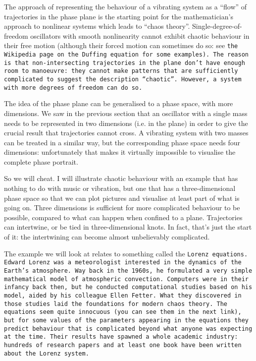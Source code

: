 

  The approach of representing the behaviour of a vibrating system as a 
  ``flow'' of trajectories in the phase plane is the starting point for the 
  mathematician’s approach to nonlinear systems which leads to ``chaos 
  theory''. Single-degree-of-freedom oscillators with smooth nonlinearity 
  cannot exhibit chaotic behaviour in their free motion (although their forced 
  motion can sometimes do so: see \tt{}the Wikipedia page on the Duffing 
  equation\rm{} for some examples). The reason is that non-intersecting 
  trajectories in the plane don't have enough room to manoeuvre: they cannot 
  make patterns that are sufficiently complicated to suggest the description 
  ``chaotic''. However, a system with more degrees of freedom can do so. 

  The idea of the phase plane can be generalised to a phase space, with more 
  dimensions. We saw in the previous section that an oscillator with a single 
  mass needs to be represented in two dimensions (i.e. in the plane) in order 
  to give the crucial result that trajectories cannot cross. A vibrating system 
  with two masses can be treated in a similar way, but the corresponding phase 
  space needs four dimensions: unfortunately that makes it virtually impossible 
  to visualise the complete phase portrait. 

  So we will cheat. I will illustrate chaotic behaviour with an example that 
  has nothing to do with music or vibration, but one that has a 
  three-dimensional phase space so that we can plot pictures and visualise at 
  least part of what is going on. Three dimensions is sufficient for more 
  complicated behaviour to be possible, compared to what can happen when 
  confined to a plane. Trajectories can intertwine, or be tied in 
  three-dimensional knots. In fact, that’s just the start of it: the 
  intertwining can become almost unbelievably complicated. 

  The example we will look at relates to something called the \tt{}Lorenz 
  equations\rm{}. Edward Lorenz was a meteorologist interested in the dynamics 
  of the Earth’s atmosphere. Way back in the 1960s, he formulated a very simple 
  mathematical model of atmospheric convection. Computers were in their infancy 
  back then, but he conducted computational studies based on his model, aided 
  by his colleague Ellen Fetter. What they discovered in those studies laid the 
  foundations for modern chaos theory. The equations seem quite innocuous (you 
  can see them in the next link), but for some values of the parameters 
  appearing in the equations they predict behaviour that is complicated beyond 
  what anyone was expecting at the time. Their results have spawned a whole 
  academic industry: hundreds of research papers and at least one book have 
  been written about the Lorenz system. 

